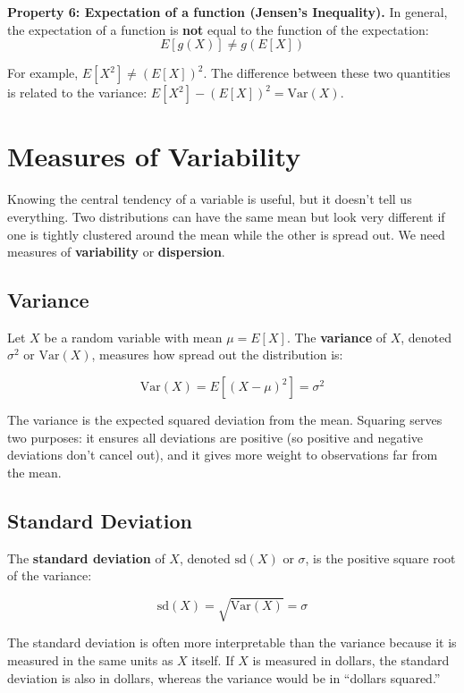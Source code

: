 \documentclass[
  letterpaper,
  DIV=11,
  numbers=noendperiod]{scrreprt}
\begin{document}
\textbf{Property 6: Expectation of a function (Jensen's Inequality).} In
general, the expectation of a function is \textbf{not} equal to the
function of the expectation: \[E[g(X)] \neq g(E[X])\]

For example, \(E[X^2] \neq (E[X])^2\). The difference between these two
quantities is related to the variance:
\(E[X^2] - (E[X])^2 = \text{Var}(X)\).

\section{Measures of Variability}\label{measures-of-variability}

Knowing the central tendency of a variable is useful, but it doesn't
tell us everything. Two distributions can have the same mean but look
very different if one is tightly clustered around the mean while the
other is spread out. We need measures of \textbf{variability} or
\textbf{dispersion}.

\subsection{Variance}\label{variance}

Let \(X\) be a random variable with mean \(\mu = E[X]\). The
\textbf{variance} of \(X\), denoted \(\sigma^2\) or \(\text{Var}(X)\),
measures how spread out the distribution is:

\[
\text{Var}(X) = E[(X - \mu)^2] = \sigma^2
\]

The variance is the expected squared deviation from the mean. Squaring
serves two purposes: it ensures all deviations are positive (so positive
and negative deviations don't cancel out), and it gives more weight to
observations far from the mean.

\subsection{Standard Deviation}\label{standard-deviation}

The \textbf{standard deviation} of \(X\), denoted \(\text{sd}(X)\) or
\(\sigma\), is the positive square root of the variance:

\[
\text{sd}(X) = \sqrt{\text{Var}(X)} = \sigma
\]

The standard deviation is often more interpretable than the variance
because it is measured in the same units as \(X\) itself. If \(X\) is
measured in dollars, the standard deviation is also in dollars, whereas
the variance would be in ``dollars squared.''
\end{document}
